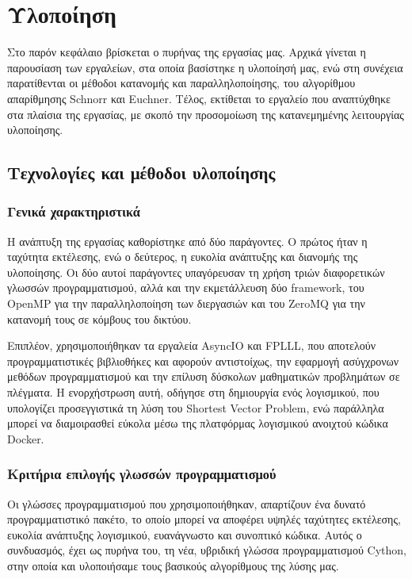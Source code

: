 \section{Υλοποίηση}
\label{chapImplementation}

Στο παρόν κεφάλαιο βρίσκεται ο πυρήνας της εργασίας μας. Αρχικά γίνεται η παρουσίαση των εργαλείων, στα οποία βασίστηκε η υλοποίησή μας, ενώ στη συνέχεια παρατίθενται οι μέθοδοι κατανομής και παραλληλοποίησης, του αλγορίθμου απαρίθμησης Schnorr και Euchner. Τέλος, εκτίθεται το εργαλείο που αναπτύχθηκε στα πλαίσια της εργασίας, με σκοπό την προσομοίωση της κατανεμημένης λειτουργίας υλοποίησης. 

\subsection{Τεχνολογίες και μέθοδοι υλοποίησης}

\subsubsection{Γενικά χαρακτηριστικά}

Η ανάπτυξη της εργασίας καθορίστηκε από δύο παράγοντες. Ο πρώτος ήταν η ταχύτητα εκτέλεσης, ενώ ο δεύτερος, η ευκολία ανάπτυξης και διανομής της υλοποίησης. Οι δύο αυτοί παράγοντες υπαγόρευσαν τη χρήση τριών διαφορετικών γλωσσών προγραμματισμού, αλλά και την εκμετάλλευση δύο framework, του OpenMP για την παραλληλοποίηση των διεργασιών και του ZeroMQ για την κατανομή τους σε κόμβους του δικτύου.  

Επιπλέον, χρησιμοποιήθηκαν τα εργαλεία AsyncIO και FPLLL, που αποτελούν προγραμματιστικές βιβλιοθήκες και αφορούν αντιστοίχως, την εφαρμογή ασύγχρονων μεθόδων προγραμματισμού και την επίλυση δύσκολων μαθηματικών προβλημάτων σε πλέγματα. Η ενορχήστρωση αυτή, οδήγησε στη δημιουργία ενός λογισμικού, που υπολογίζει προσεγγιστικά τη λύση του Shortest Vector Problem, ενώ παράλληλα μπορεί να διαμοιρασθεί εύκολα μέσω της πλατφόρμας λογισμικού ανοιχτού κώδικα Docker. 


\subsubsection{Κριτήρια επιλογής γλωσσών προγραμματισμού}

Οι γλώσσες προγραμματισμού που χρησιμοποιήθηκαν, απαρτίζουν ένα δυνατό προγραμματιστικό πακέτο, το οποίο μπορεί να αποφέρει υψηλές ταχύτητες εκτέλεσης, ευκολία ανάπτυξης λογισμικού, ευανάγνωστο και συνοπτικό κώδικα. Αυτός ο συνδυασμός, έχει ως πυρήνα του, τη νέα, υβριδική γλώσσα προγραμματισμού Cython, στην οποία και υλοποιήσαμε τους βασικούς αλγορίθμους της λύσης μας. 


